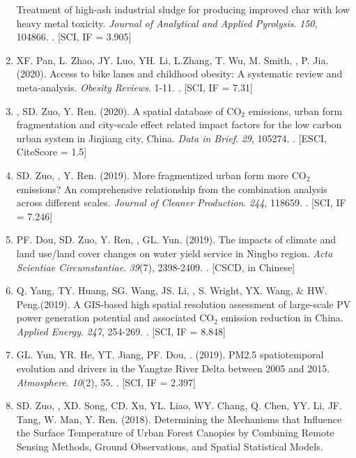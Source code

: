 \begin{enumerate}
    Treatment of high-ash industrial sludge for producing improved char with low heavy metal toxicity.
    \textit{Journal of Analytical and Applied Pyrolysis}. \textit{150}, 104866.
    . [SCI, IF = 3.905]
\item
    XF. Pan, L. Zhao, JY. Luo, YH. Li, L.Zhang, T. Wu, M. Smith, \Shaoqing, P. Jia. (2020).
    Access to bike lanes and childhood obesity: A systematic review and meta‐analysis.
    \textit{Obesity Reviews}. 1-11.
    . [SCI, IF = 7.31]
\item
    \Shaoqing, SD. Zuo, Y. Ren. (2020).
    A spatial database of CO$_2$ emissions, urban form fragmentation and city-scale effect related impact factors for the low carbon urban system in Jinjiang city, China.
    \textit{Data in Brief}. \textit{29}, 105274.
    . [ESCI, CiteScore = 1.5]
\item
    SD. Zuo, \Shaoqing, Y. Ren. (2019).
    More fragmentized urban form more CO$_2$ emissions? An comprehensive relationship from the combination analysis across different scales.
    \textit{Journal of Cleaner Production}. \textit{244}, 118659.
    . [SCI, IF = 7.246]
\item
    PF. Dou, SD. Zuo, Y. Ren, \Shaoqing, GL. Yun. (2019).
    The impacts of climate and land use/land cover changes on water yield service in Ningbo region.
    \textit{Acta Scientiae Circumstantiae}. \textit{39}(7), 2398-2409.
    . [CSCD, in Chinese] 
\item
    Q. Yang, TY. Huang, SG. Wang, JS. Li, \Shaoqing, S. Wright, YX. Wang, \& HW. Peng.(2019).
    A GIS-based high spatial resolution assessment of large-scale PV power generation potential and associated CO$_2$ emission reduction in China.
    \textit{Applied Energy}. \textit{247}, 254-269.
    . [SCI, IF = 8.848]
\item
    GL. Yun, YR. He, YT. Jiang, PF. Dou, \Shaoqing. (2019).
    PM2.5 spatiotemporal evolution and drivers in the Yangtze River Delta between 2005 and 2015.
    \textit{Atmosphere}. \textit{10}(2), 55.
    . [SCI, IF = 2.397]
\item
    SD. Zuo, \Shaoqing, XD. Song, CD. Xu, YL. Liao, WY. Chang, Q. Chen, YY. Li, JF. Tang, W. Man, Y. Ren. (2018).
    Determining the Mechanisms that Influence the Surface Temperature of Urban Forest Canopies by Combining Remote Sensing Methods, Ground Observations, and Spatial Statistical Models. 

\end{enumerate}
